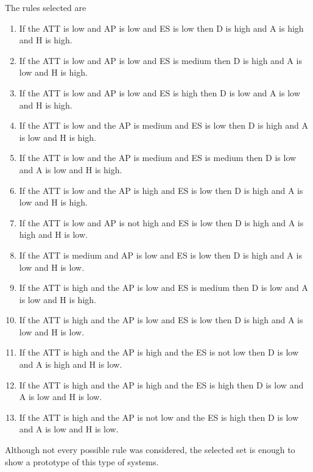 \documentclass[conference]{IEEEtran}
\theoremstyle{definition}
\theoremstyle{remark}
\theoremstyle{remark}
\begin{document}
The rules selected are
\begin{enumerate}
  \item If the ATT is low and AP is low and ES is low then D is high and A
    is high and H is high.

  \item If the ATT is low and AP is low and ES is medium then D is high and A is
    low and H is high.

  \item If the ATT is low and AP is low and ES is high then D is low and A is
    low and H is high.

  \item If the ATT is low and the AP is medium and ES is low then D is high and
    A is low and H is high.

  \item If the ATT is low and the AP is medium and ES is medium then D is low
    and A is low and H is high.

  \item If the ATT is low and the AP is high and ES is low then D is high and A
    is low and H is high.

  \item If the ATT is low and AP is not high and ES is low then D is high and A
    is high and H is low.

  \item If the ATT is medium and AP is low and ES is low then D is high and A is
    low and H is low.

  \item If the ATT is high and the AP is low and ES is medium then D is low
    and A is low and H is high.

  \item If the ATT is high and the AP is low and ES is low then D is high and A
    is low and H is low.

  \item If the ATT is high and the AP is high and the ES is not low then D is
    low and A is high and H is low.

  \item If the ATT is high and the AP is high and the ES is high then D is low
    and A is low and H is low.

  \item If the ATT is high and the AP is not low and the ES is high then D is
    low and A is low and H is low.
\end{enumerate}

Although not every possible rule was considered, the selected set is enough to
show a prototype of this type of systems.
\end{document}
